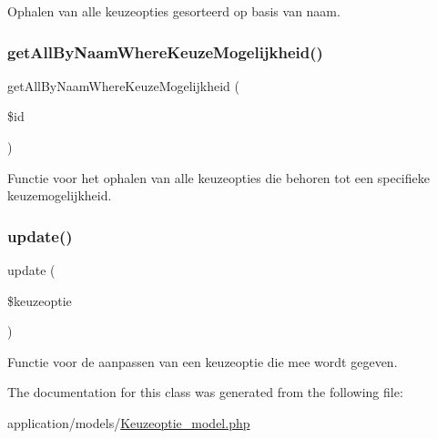 Ophalen van alle keuzeopties gesorteerd op basis van naam. 

\mbox{\label{class_keuzeoptie___model_a6f3e4d26ab480501524eabb01683f5f7}} 
\subsubsection{\texorpdfstring{get\+All\+By\+Naam\+Where\+Keuze\+Mogelijkheid()}{getAllByNaamWhereKeuzeMogelijkheid()}}
{\footnotesize\ttfamily get\+All\+By\+Naam\+Where\+Keuze\+Mogelijkheid (\begin{DoxyParamCaption}\item[{}]{\$id }\end{DoxyParamCaption})}



Functie voor het ophalen van alle keuzeopties die behoren tot een specifieke keuzemogelijkheid. 

\mbox{\label{class_keuzeoptie___model_a9d98d1a6c3919a0e7b946d37fa385948}} 
\subsubsection{\texorpdfstring{update()}{update()}}
{\footnotesize\ttfamily update (\begin{DoxyParamCaption}\item[{}]{\$keuzeoptie }\end{DoxyParamCaption})}



Functie voor de aanpassen van een keuzeoptie die mee wordt gegeven. 



The documentation for this class was generated from the following file\+:\begin{DoxyCompactItemize}
\item 
application/models/\mbox{\hyperlink{_keuzeoptie__model_8php}{Keuzeoptie\+\_\+model.\+php}}\end{DoxyCompactItemize}
